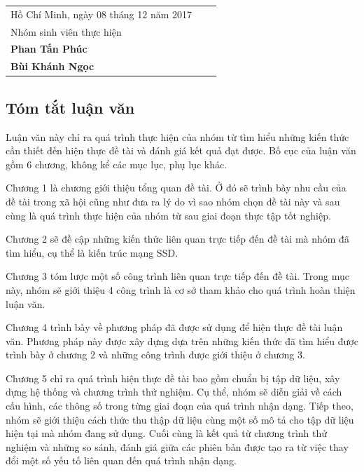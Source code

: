 \documentclass[a4paper,12pt]{article}
\begin{document}
	\begin{table}[h]
		\begin{tabular}{lll}
			\hspace{8cm} Hồ Chí Minh, ngày 08 tháng 12 năm 2017\\
			\hspace{10cm}Nhóm sinh viên thực hiện\\
			\hspace{10.5cm}\textbf{Phan Tấn Phúc}\\
			\hspace{10.5cm}\textbf{Bùi Khánh Ngọc}
		\end{tabular}
	\end{table}
	
	\newpage
	\subsection*{Tóm tắt luận văn}
	
	Luận văn  này chỉ ra quá trình thực hiện của nhóm từ tìm hiểu những kiến thức cần thiết đến hiện thực đề tài và đánh giá kết quả đạt được. Bố cục của luận văn gồm 6 chương, không kể các mục lục, phụ lục khác. 
	
	Chương 1 là chương giới thiệu tổng quan đề tài. Ở đó sẽ trình bày nhu cầu của đề tài trong xã hội cũng như đưa ra lý do vì sao nhóm chọn đề tài này và sau cùng là quá trình thực hiện của nhóm từ sau giai đoạn thực tập tốt nghiệp.
	
	Chương 2 sẽ đề cập những kiến thức liên quan trực tiếp đến đề tài mà nhóm đã tìm hiểu, cụ thể là kiến trúc mạng SSD.
	
	Chương 3 tóm lược một số công trình liên quan trực tiếp đến đề tài. Trong mục này, nhóm sẽ giới thiệu 4 công trình là cơ sở tham khảo cho quá trình hoàn thiện luận văn. 
	
	Chương 4 trình bày về phương pháp đã được sử dụng để hiện thực đề tài luận văn. Phương pháp này được xây dựng dựa trên những kiến thức đã tìm hiểu được trình bày ở chương 2 và những công trình được giới thiệu ở chương 3.
	
	Chương 5 chỉ ra quá trình hiện thực đề tài bao gồm chuẩn bị tập dữ liệu, xây dựng hệ thống và chương trình thử nghiệm. Cụ thể, nhóm sẽ diễn giải về cách cấu hình, các thông số trong từng giai đoạn của quá trình nhận dạng. Tiếp theo, nhóm sẽ giới thiệu cách thức thu thập dữ liệu cùng một số mô tả cho tập dữ liệu hiện tại mà nhóm đang sử dụng. Cuối cùng là kết quả từ chương trình thử nghiệm và những so sánh, đánh giá giữa các phiên bản được tạo ra từ việc thay đổi một số yếu tố liên quan đến quá trình nhận dạng. 
	
\end{document}
